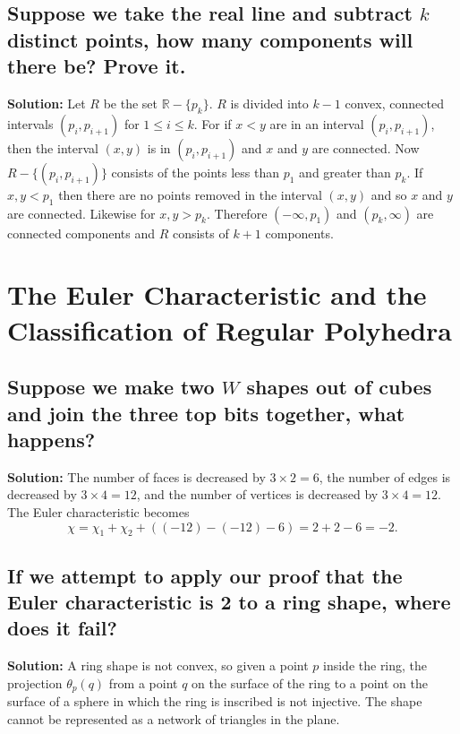 \documentclass{article}
\newcommand{\exercise}[1]{\subsection{\normalfont #1}}
\newcommand{\solution}{\indent\indent \textbf{Solution: }}
\begin{document}
\exercise{Suppose we take the real line and subtract $k$ distinct points, how many components will there be? Prove it.} %
\solution Let $R$ be the set $\mathbb{R} - \{p_k\}$. $R$ is divided into $k-1$ convex, connected intervals $(p_i, p_{i+1})$ for $1\leq i \leq k$. For if $x<y$ are in an interval $(p_i,p_{i+1})$, then the interval $(x,y)$ is in $(p_i,p_{i+1})$ and $x$ and $y$ are connected. Now $R - \{(p_i, p_{i+1})\}$ consists of the points less than $p_1$ and greater than $p_k$. If $x, y< p_1$ then there are no points removed in the interval $(x,y)$ and so $x$ and $y$ are connected. Likewise for $x, y > p_k$. Therefore $(-\infty, p_1)$ and $(p_k, \infty)$ are connected components and $R$ consists of $k+1$ components. 

\newpage
\section{The Euler Characteristic and the Classification of Regular Polyhedra}
\exercise{Suppose we make two $W$ shapes out of cubes and join the three top bits together, what happens?} %
\solution The number of faces is decreased by $3\times 2 = 6$, the number of edges is decreased by $3\times 4 = 12$, and the number of vertices is decreased by $3\times 4 = 12$. The Euler characteristic becomes
$$\chi = \chi_1 + \chi_2 + ( (-12) -(-12) - 6) = 2 + 2 -6 = -2.$$ 

\exercise{If we attempt to apply our proof that the Euler characteristic is 2 to a ring shape, where does it fail?} %
\solution A ring shape is not convex, so given a point $p$ inside the ring, the projection $\theta_p(q)$ from a point $q$ on the surface of the ring to a point on the surface of a sphere in which the ring is inscribed is not injective. The shape cannot be represented as a network of triangles in the plane.
\end{document}
